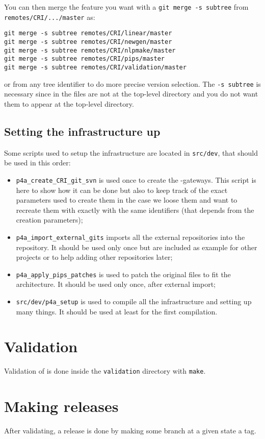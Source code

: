 \documentclass[a4paper]{article}
\begin{document}
You can then merge the feature you want with a \texttt{git merge -s
  subtree} from \texttt{remotes/CRI/.../master} as:
\begin{verbatim}
git merge -s subtree remotes/CRI/linear/master
git merge -s subtree remotes/CRI/newgen/master
git merge -s subtree remotes/CRI/nlpmake/master
git merge -s subtree remotes/CRI/pips/master
git merge -s subtree remotes/CRI/validation/master
\end{verbatim}
or from any tree identifier to do more precise version selection. The
\texttt{-s subtree} is necessary since in \Apfa the \Apips files are not
at the top-level directory and you do not want them to appear at the
top-level directory.


\subsection{Setting the infrastructure up}
\label{sec:setup}

Some scripts used to setup the infrastructure are located in
\texttt{src/dev}, that should be used in this order:
\begin{itemize}
\item \verb/p4a_create_CRI_git_svn/ is used once to create the \Apips
  \Asvn-\Agit gateways. This script is here to show how it can be done but
  also to keep track of the exact parameters used to create them in the
  case we loose them and want to recreate them with exactly with the same
  identifiers (that depends from the creation parameters);
\item \verb/p4a_import_external_gits/ imports all the external \Agit
  repositories into the \Apfa \Agit repository. It should be used only
  once but are included as example for other projects or to help adding
  other repositories later;
\item \verb/p4a_apply_pips_patches/ is used to patch the original \Apips
  files to fit the \Apfa architecture. It should be used only once, after
  external \Agit import;
\item \verb|src/dev/p4a_setup| is used to compile all the \Apfa
  infrastructure and setting up many things. It should be used at least
  for the first compilation.
\end{itemize}


\section{Validation}
\label{sec:validation}


Validation of \Apfa is done inside the \texttt{validation} directory with
\texttt{make}.


\section{Making releases}
\label{sec:releases}

After validating, a release is done by making some branch at a given state
a tag.
\end{document}
